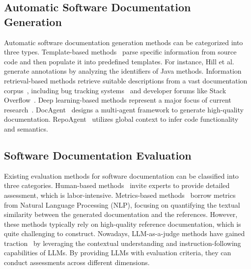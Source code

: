 \subsection{Automatic Software Documentation Generation}
Automatic software documentation generation methods can be categorized into three types. Template-based methods~\cite{template2, template3, template4} parse specific information from source code and then populate it into predefined templates. For instance, Hill et al.~\cite{template1} generate annotations by analyzing the identifiers of Java methods. Information retrieval-based methods retrieve suitable descriptions from a vast documentation corpus~\cite{info-retrieve1, info-retrieve4, info-retrieve5}, including bug tracking systems~\cite{info-retrieve2} and developer forums like Stack Overflow~\cite{info-retrieve3}. Deep learning-based methods represent a major focus of current research~\cite{deep-learning1, deep-learning2, deep-learning5}. DocAgent~\cite{docagent} designs a multi-agent framework to generate high-quality documentation. RepoAgent~\cite{repoagent} utilizes global context to infer code functionality and semantics. 

\subsection{Software Documentation Evaluation}
Existing evaluation methods for software documentation can be classified into three categories. Human-based methods~\cite{human1, human2, human3} invite experts to provide detailed assessment, which is labor-intensive. Metrics-based methods~\cite{bleu, meteor, cider, rouge} borrow metrics from Natural Language Processing (NLP), focusing on quantifying the textual similarity between the generated documentation and the references. However, these methods typically rely on high-quality reference documentation, which is quite challenging to construct. Nowadays, LLM-as-a-judge methods have gained traction~\cite{hierarchical, docagent} by leveraging the contextual understanding and instruction-following capabilities of LLMs. By providing LLMs with evaluation criteria, they can conduct assessments across different dimensions. 